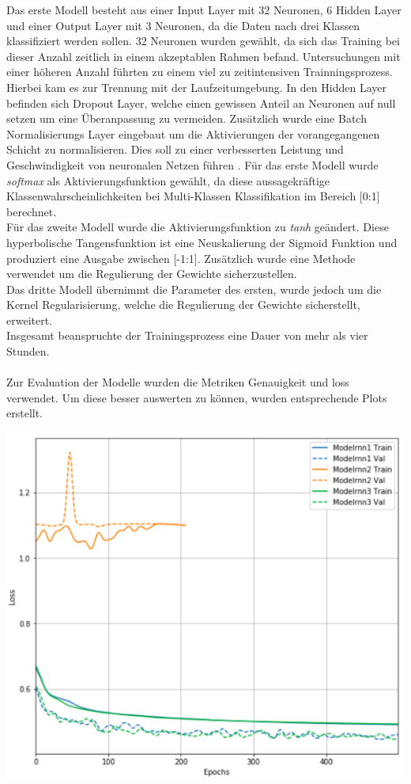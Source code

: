 \documentclass[
    12pt, %
    DIV10,
    ngerman, %
    a4paper, %
    oneside, %
    titlepage, %
    parskip=half, %
    headings=normal, %
    listof=totoc, %
    bibliography=totoc, %
    index=totoc, %
    captions=tableheading, %
    final %
]{scrreprt}
\begin{document}
Das erste Modell besteht aus einer Input Layer mit 32 Neuronen, 6 Hidden Layer und einer Output Layer mit 3 Neuronen, da die Daten nach drei Klassen klassifiziert werden sollen. 32 Neuronen wurden gewählt, da sich das Training bei dieser Anzahl zeitlich in einem akzeptablen Rahmen befand. Untersuchungen mit einer höheren Anzahl führten zu einem viel zu zeitintensiven Trainningsprozess. Hierbei kam es zur Trennung mit der Laufzeitumgebung. In den Hidden Layer befinden sich Dropout Layer, welche einen gewissen Anteil an Neuronen auf null setzen um eine Überanpassung zu vermeiden. Zusätzlich wurde eine Batch Normalisierungs Layer eingebaut um die Aktivierungen der vorangegangenen Schicht zu normalisieren. Dies soll zu einer verbesserten Leistung und Geschwindigkeit von neuronalen Netzen führen \parencite{Ioffe}. Für das erste Modell wurde \emph{softmax} als Aktivierungsfunktion gewählt, da diese aussagekräftige Klassenwahrscheinlichkeiten bei Multi-Klassen Klassifikation im Bereich [0:1] berechnet.\\
Für das zweite Modell wurde die Aktivierungsfunktion zu \emph{tanh} geändert. Diese hyperbolische Tangensfunktion ist eine Neuskalierung der Sigmoid Funktion und produziert eine Ausgabe zwischen [-1:1]. Zusätzlich wurde eine Methode verwendet um die Regulierung der Gewichte sicherzustellen.\\
Das dritte Modell übernimmt die Parameter des ersten, wurde jedoch um die Kernel Regularisierung, welche die Regulierung der Gewichte sicherstellt, erweitert.\\
Insgesamt beanspruchte der Trainingsprozess eine Dauer von mehr als vier Stunden.\\\\
Zur Evaluation der Modelle wurden die Metriken Genauigkeit und loss verwendet. Um diese besser auswerten zu können, wurden entsprechende Plots erstellt.
\begin{center}
\includegraphics[scale=0.7]{img/lossAll.pdf}
\label{fig:loss}
\end{center}
\end{document}

